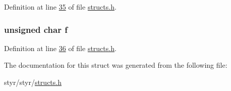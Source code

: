 Definition at line \hyperlink{structs_8h_source_l00035}{35} of file \hyperlink{structs_8h_source}{structs.\+h}.

\subsubsection[{\texorpdfstring{f}{f}}]{\setlength{\rightskip}{0pt plus 5cm}unsigned char f}\hypertarget{structsix__uchar_a7ceb8bf372a716e22ab056d1b7df49e7}{}\label{structsix__uchar_a7ceb8bf372a716e22ab056d1b7df49e7}


Definition at line \hyperlink{structs_8h_source_l00036}{36} of file \hyperlink{structs_8h_source}{structs.\+h}.



The documentation for this struct was generated from the following file\+:\begin{DoxyCompactItemize}
\item 
styr/styr/\hyperlink{structs_8h}{structs.\+h}\end{DoxyCompactItemize}
